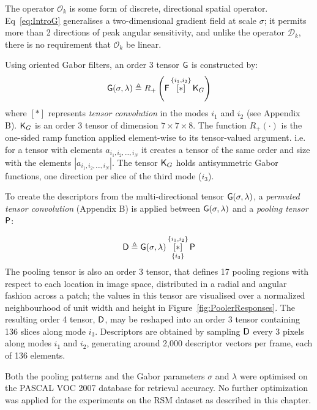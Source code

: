 The operator $\mathcal{O}_k$ is some form of discrete, directional spatial operator. Eq~\ref{eq:IntroG} generalises a two-dimensional gradient field at scale $\sigma$; it permits more than 2 directions of peak angular sensitivity, and unlike the operator $\mathcal{D}_k$, there is no requirement that $\mathcal{O}_k$ be linear.

Using oriented Gabor filters, an order 3 tensor $\mathsf{G}$ is constructed by:
\begin{equation}
\mathsf{G}(\sigma,\lambda) \triangleq R_+ \left ( \mathsf{F} \, \overset{\lbrace i_1,i_2\rbrace}{[ \ast ]}\, {\mathsf{K}_{G}} \right )
\end{equation}
where $[ \ast ]$ represents {\it tensor convolution} in the modes $i_1$ and $i_2$ (see Appendix B). $\mathsf{K}_{G}$ is an order 3 tensor of dimension $7 \times 7 \times 8$. The function $R_+(\cdot)$ is the one-sided ramp function applied element-wise to its tensor-valued argument. i.e. for a tensor with elements $a_{i_1,i_2,...,i_N}$ it creates a tensor of the same order and size with the elements $|a_{i_1,i_2,...,i_N}|$.  The tensor $\mathsf{K}_{G}$ holds antisymmetric Gabor functions, one direction per slice of the third mode ($i_3$). 

To create the descriptors from the multi-directional tensor $\mathsf{G}(\sigma,\lambda)$, a {\it permuted tensor convolution} (Appendix B) is applied between $\mathsf{G}(\sigma,\lambda)$ and a {\it pooling tensor} $\mathsf{P}$:  

\begin{equation}
\mathsf{D} \triangleq \mathsf{G}(\sigma,\lambda) \, 
   \underset{\lbrace i_3 \rbrace}{\overset{\lbrace i_1,i_2\rbrace}{[ \ast ]}}\, {\mathsf{P}}
\end{equation}
The pooling tensor is also an order 3 tensor, that defines 17 pooling regions with respect to each location in image space, distributed in a radial and angular fashion across a patch; the values in this tensor are visualised over a normalized neighbourhood of unit width and height in Figure~\ref{fig:PoolerResponses}. The resulting order 4 tensor, $\mathsf{D}$, may be reshaped \citep{kolda2009tensor} into an order 3 tensor containing 136 slices along mode $i_3$. Descriptors are obtained by sampling $\mathsf{D}$ every 3 pixels along modes $i_1$ and $i_2$, generating around 2,000 descriptor vectors per frame, each of 136 elements.

Both the pooling patterns and the Gabor parameters $\sigma$ and $\lambda$ were optimised on the PASCAL VOC 2007 database \citep{everingham2010pascal} for retrieval accuracy. No further optimization was applied for the experiments on the RSM dataset as described in this chapter.

